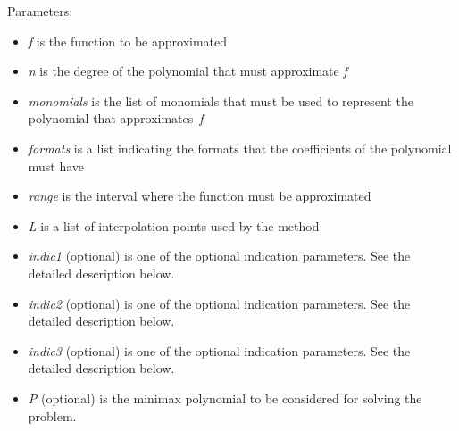 Parameters: 
\begin{itemize}
\item \emph{f} is the function to be approximated
\item \emph{n} is the degree of the polynomial that must approximate \emph{f}
\item \emph{monomials} is the list of monomials that must be used to represent the polynomial that approximates~\emph{f}
\item \emph{formats} is a list indicating the formats that the coefficients of the polynomial must have
\item \emph{range} is the interval where the function must be approximated
\item \emph{L} is a list of interpolation points used by the method
\item \emph{indic1} (optional) is one of the optional indication parameters. See the detailed description below.
\item \emph{indic2} (optional) is one of the optional indication parameters. See the detailed description below.
\item \emph{indic3} (optional) is one of the optional indication parameters. See the detailed description below.
\item \emph{P} (optional) is the minimax polynomial to be considered for solving the problem.
\end{itemize}

